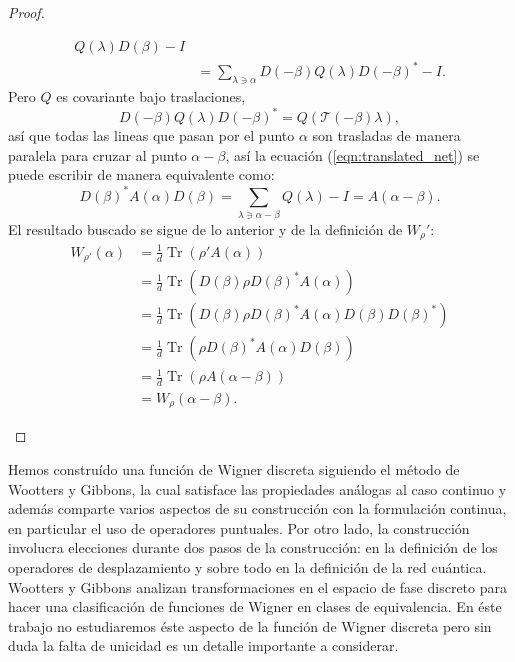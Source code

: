 \documentclass[a4paper]{report}
\DeclareMathOperator{\Tr}{Tr}
\begin{document}
\begin{proof}
\begin{enumerate}
\begin{align}
          Q(\lambda) D(\beta) - I \\
          &= \sum_{\lambda \ni \alpha}^{} 
          D(-\beta) Q(\lambda) D(-\beta)^{*} - I.
          \label{eqn:translated_net}
        \end{align}
        Pero $Q$ es covariante bajo traslaciones,
        \begin{equation}
          D(-\beta) Q(\lambda) D(-\beta)^{*}
          = Q\left(\mathcal T(-\beta) \lambda\right),
        \end{equation}
        así que todas las lineas que pasan por el punto
        $\alpha$ son trasladas de manera paralela para
        cruzar al punto $\alpha - \beta$, así la ecuación
        (\ref{eqn:translated_net}) se puede escribir de
        manera equivalente como:
        \begin{equation}
          D(\beta)^{*} A(\alpha) D(\beta) 
          = \sum_{\lambda \ni \alpha - \beta}^{} Q(\lambda)
          - I 
          = A(\alpha - \beta).
        \end{equation}
        El resultado buscado se sigue de lo anterior y de la
        definición de $W_\rho'$:
        \begin{align}
          W_{\rho'}(\alpha)
          &= \frac{1}{d} \Tr\left( \rho' A(\alpha) \right) \\
          &= \frac{1}{d} \Tr\left(D(\beta) \rho D(\beta)^{*}
          A(\alpha)\right) \\
          &= \frac{1}{d} \Tr\left( D(\beta) \rho
          D(\beta)^{*} A(\alpha) D(\beta) D(\beta)^{*}
          \right) \\
          &= \frac{1}{d} \Tr\left( \rho D(\beta)^{*}
          A(\alpha) D(\beta) \right) \\
          &= \frac{1}{d} \Tr\left( \rho A(\alpha-\beta)
          \right) \\
          &= W_\rho(\alpha-\beta).
        \end{align}
    \end{enumerate}
  \end{proof}

  Hemos construído una función de Wigner discreta siguiendo
  el método de Wootters y Gibbons, la cual satisface las
  propiedades análogas al caso continuo y además comparte
  varios aspectos de su construcción con la formulación
  continua, en particular el uso de operadores puntuales.
  Por otro lado, la construcción involucra elecciones
  durante dos pasos de la construcción: en la definición de
  los operadores de desplazamiento y sobre todo en la
  definición de la red cuántica. Wootters y Gibbons analizan
  transformaciones en el espacio de fase discreto para hacer
  una clasificación de funciones de Wigner en clases de
  equivalencia. En éste trabajo no estudiaremos éste aspecto
  de la función de Wigner discreta pero sin duda la falta de
  unicidad es un detalle importante a considerar.
\end{document}
